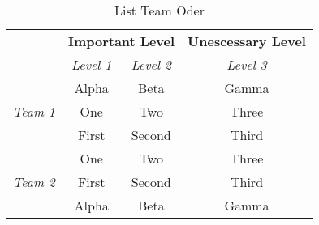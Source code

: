 \usepackage{booktabs}
\usepackage{multirow}
\usepackage{array}
\setlength{\belowrulesep}{0pt}

\begin{table}
    \centering
    \begin{tabular}{@{}*4c}
        \toprule[1.5pt]
        & \multicolumn{2}{l}{\bfseries Important Level} &
        \multicolumn{1}{r}{\bfseries Unescessary Level}\\
        & \em Level 1 &\em Level 2 & \em Level 3 \\
        \cmidrule(lr){2-3}\cmidrule(l){4-4}
        \multirow{3}{*}{\itshape\sffamily Team 1} & Alpha & Beta &Gamma\\
        & One & Two & Three\\
        & First & Second & Third\\
        \cmidrule(lr){2-3}\cmidrule(l){4-4}
        \multirow{3}{*}{\itshape\sffamily Team 2} & One & Two &Three\\
        & First& Second & Third\\
        & Alpha & Beta & Gamma\\
        \bottomrule[1.5pt]
    \end{tabular}
    \caption{List Team Oder}
\end{table}

